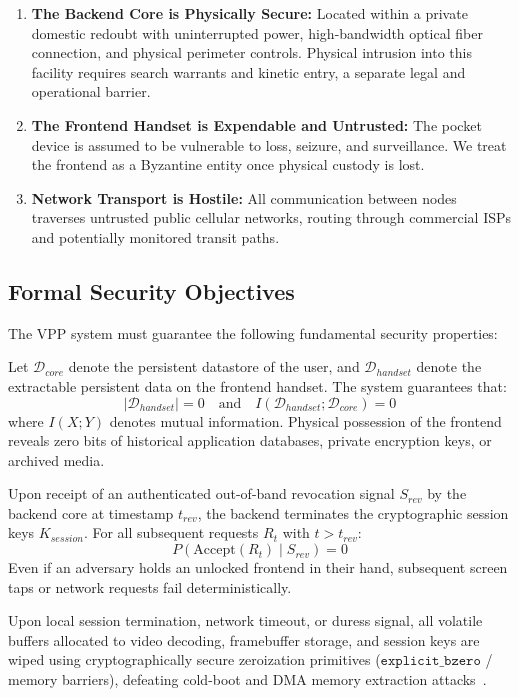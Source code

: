 \begin{enumerate}
    \item \textbf{The Backend Core is Physically Secure:} Located within a private domestic redoubt with uninterrupted power, high-bandwidth optical fiber connection, and physical perimeter controls. Physical intrusion into this facility requires search warrants and kinetic entry, a separate legal and operational barrier.
    \item \textbf{The Frontend Handset is Expendable and Untrusted:} The pocket device is assumed to be vulnerable to loss, seizure, and surveillance. We treat the frontend as a Byzantine entity once physical custody is lost.
    \item \textbf{Network Transport is Hostile:} All communication between nodes traverses untrusted public cellular networks, routing through commercial ISPs and potentially monitored transit paths.
\end{enumerate}

\subsection{Formal Security Objectives}
The VPP system must guarantee the following fundamental security properties:

\begin{property}
Let $\mathcal{D}_{core}$ denote the persistent datastore of the user, and $\mathcal{D}_{handset}$ denote the extractable persistent data on the frontend handset. The system guarantees that:
\begin{equation}
    |\mathcal{D}_{handset}| = 0 \quad \text{and} \quad I(\mathcal{D}_{handset}; \mathcal{D}_{core}) = 0
\end{equation}
where $I(X; Y)$ denotes mutual information. Physical possession of the frontend reveals zero bits of historical application databases, private encryption keys, or archived media.
\end{property}

\begin{property}
Upon receipt of an authenticated out-of-band revocation signal $S_{rev}$ by the backend core at timestamp $t_{rev}$, the backend terminates the cryptographic session keys $K_{session}$. For all subsequent requests $R_t$ with $t > t_{rev}$:
\begin{equation}
    P(\text{Accept}(R_t) \mid S_{rev}) = 0
\end{equation}
Even if an adversary holds an unlocked frontend in their hand, subsequent screen taps or network requests fail deterministically.
\end{property}

\begin{property}
Upon local session termination, network timeout, or duress signal, all volatile buffers allocated to video decoding, framebuffer storage, and session keys are wiped using cryptographically secure zeroization primitives ($\texttt{explicit\_bzero}$ / memory barriers), defeating cold-boot and DMA memory extraction attacks~\cite{halderman2008coldboot}.
\end{property}
